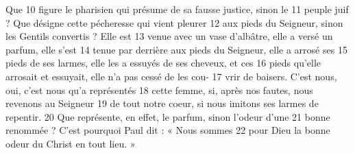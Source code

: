 Que	 
10	 	figure le pharisien qui présume de sa fausse justice, sinon le	 
11	 	peuple juif ? Que désigne cette pécheresse qui vient pleurer	 
12	 	aux pieds du Seigneur, sinon les Gentils convertis ? Elle est	 
13	 	venue avec un vase d'albâtre, elle a versé un parfum, elle s'est	 
14	 	tenue par derrière aux pieds du Seigneur, elle a arrosé ses	 
15	 	pieds de ses larmes, elle les a essuyés de ses cheveux, et ces	 
16	 	pieds qu'elle arrosait et essuyait, elle n'a pas cessé de les cou-	 
17	 	vrir de baisers. C'est nous, oui, c'est nous qu'a représentés	 
18	 	cette femme, si, après nos fautes, nous revenons au Seigneur	 
19	 	de tout notre coeur, si nous imitons ses larmes de repentir.	 
20	 	Que représente, en effet, le parfum, sinon l'odeur d'une	 
21	 	bonne renommée ? C'est pourquoi Paul dit : « Nous sommes	 
22	 	pour Dieu la bonne odeur du Christ en tout lieu. »